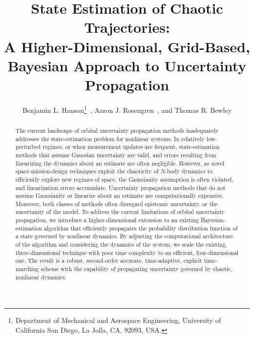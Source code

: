 \documentclass[paper,11pt]{AAS}
\begin{document}
\title{State Estimation of Chaotic Trajectories:
\\ A Higher-Dimensional, Grid-Based, Bayesian Approach to Uncertainty Propagation}

\author{Benjamin L. Hanson\thanks{Department of Mechanical and Aerospace Engineering, University of California San Diego, La Jolla, CA, 92093, USA.}\ , 
Aaron J. Rosengren\footnotemark[1]\ , and Thomas R. Bewley\footnotemark[1]
}


\maketitle{} 		

\begin{abstract}
    The current landscape of orbital uncertainty propagation methods inadequately addresses the state-estimation problem for nonlinear systems. In relatively low-perturbed regimes, or when measurement updates are frequent, state-estimation methods that assume Gaussian uncertainty are valid, and errors resulting from linearizing the dynamics about an estimate are often negligible. However, as novel space-mission-design techniques exploit the chaoticity of $N$-body dynamics to efficiently explore new regimes of space, the Gaussianity assumption is often violated, and linearization errors accumulate. Uncertainty propagation methods that do not assume Gaussianity or linearize about an estimate are computationally expensive. Moreover, both classes of methods often disregard epistemic uncertainty, or the uncertainty of the model. To address the current limitations of orbital uncertainty propagation, we introduce a higher-dimensional extension to an existing Bayesian-estimation algorithm that efficiently propagates the probability distribution function of a state governed by nonlinear dynamics. By adjusting the computational architecture of the algorithm and considering the dynamics of the system, we scale the existing, three-dimensional technique with poor time complexity to an efficient, four-dimensional one. The result is a robust, second-order accurate, time-adaptive, explicit time-marching scheme with the capability of propagating uncertainty governed by chaotic, nonlinear dynamics. 
\end{abstract}
\end{document}
